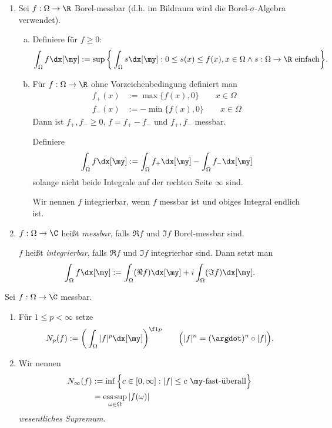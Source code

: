 \begin{df}
	\begin{enumerate}[1)]
		\item
			Sei $f: \Omega \to \R$ Borel-messbar (d.h. im Bildraum wird die Borel-$\sigma$-Algebra verwendet).

			\begin{enumerate}[a)]
				\item
					Definiere für $f \ge 0$:
					\[
						\int_{\Omega} f \dx[\my]
						:= \sup \bigg\{ \int_{\Omega} s \dx[\my] : 0 \le s(x) \le f(x), x \in \Omega \land s : \Omega \to \R \text{ einfach} \bigg\}.
					\]
				\item
					Für $f: \Omega \to \R$ ohne Vorzeichenbedingung definiert man
					\begin{align*}
						f_+ (x) &:= \max\{f(x), 0 \} \qquad x \in \Omega \\
						f_- (x) &:= -\min\{ f(x), 0 \} \qquad x \in \Omega
					\end{align*}
					Dann ist $f_+, f_- \ge 0$, $f = f_+ - f_-$ und $f_+, f_-$ messbar.

					Definiere
					\[
						\int_{\Omega} f \dx[\my] := \int_{\Omega} f_+ \dx[\my] - \int_{\Omega} f_- \dx[\my]
					\]
					solange nicht beide Integrale auf der rechten Seite $\infty$ sind.

					Wir nennen $f$ integrierbar, wenn $f$ messbar ist und obiges Integral endlich ist.
			\end{enumerate}
		\item
			$f : \Omega \to \C$ heißt \emph{messbar}, falls $\Re f$ und $\Im f$ Borel-messbar sind.

			$f$ heißt \emph{integrierbar}, falls $\Re f$ und $\Im f$ integrierbar sind.
			Dann setzt man
			\[
				\int_{\Omega} f \dx[\my] := \int_{\Omega} (\Re f) \dx[\my] + i \int_{\Omega} (\Im f) \dx[\my] .
			\]
	\end{enumerate}

\end{df}


\begin{df} \label{2.4}
	Sei $f: \Omega \to \C$ messbar.
	\begin{enumerate}[1)]
		\item
			Für $1 \le p < \infty$ setze
			\[
				N_p(f) := \bigg( \int_{\Omega} |f|^p \dx[\my] \bigg)^{\f 1p}
				\qquad \Big( |f|^n = (\argdot)^n \circ |f| \Big).
			\]
		\item
			Wir nennen
			\begin{align*}
					\displaystyle N_\infty(f)
					&:= \inf \Big\{ c \in [0,\infty] : |f|\le c \text{ $\my$-fast-überall} \Big\} \\
					&= \esssup_{\omega \in \Omega} |f(\omega)|
			\end{align*}
			\emph{wesentliches Supremum}.
	\end{enumerate}
\end{df}

